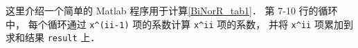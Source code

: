 
这里介绍一个简单的 Matlab 程序用于计算\autoref{BiNorR_tab1}． 第 7-10 行的循环中， 每个循环通过 \lstinline|x^(ii-1)| 项的系数计算 \lstinline|x^ii| 项的系数， 并将 \lstinline|x^ii| 项累加到求和结果 \lstinline|result| 上．

